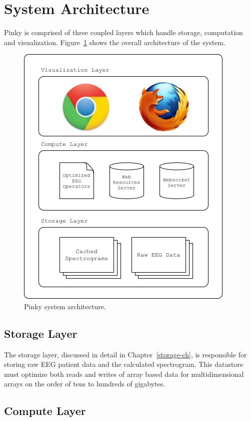 \section{System Architecture}

Pinky is comprised of three coupled layers which handle storage, computation
and visualization. Figure~\ref{fig:system-architecture} shows the overall
architecture of the system.

\begin{figure}[h]
\begin{center}
\includegraphics[scale=0.75]{./img/system-architecture.png}
\caption{Pinky system architecture.}
\label{fig:system-architecture}
\end{center}
\end{figure}

\subsection{Storage Layer}

The storage layer, discussed in detail in Chapter~\ref{storage-ch}, is
responsible for storing raw EEG patient data and the calculated spectrogram.
This datastore must optimize both reads and writes of array based data for
multidimensional arrays on the order of tens to hundreds of gigabytes.

\subsection{Compute Layer}

